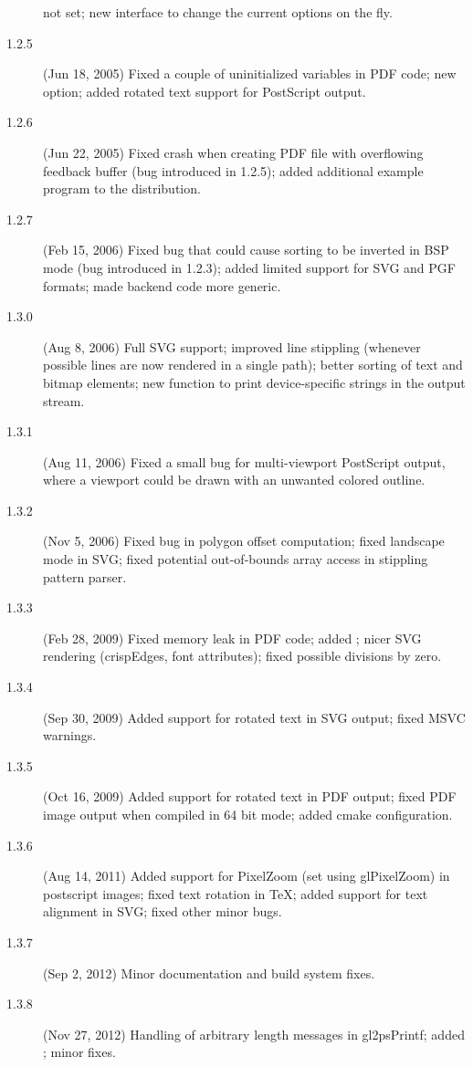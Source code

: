 \begin{description}
  not set; new  interface to change the current
  options on the fly.
\item[1.2.5] (Jun 18, 2005) Fixed a couple of uninitialized variables in
  PDF code; new  option; added rotated
  text support for PostScript output.
\item[1.2.6] (Jun 22, 2005) Fixed crash when creating PDF file with
  overflowing feedback buffer (bug introduced in 1.2.5); added
  additional example program  to the
  distribution.
\item[1.2.7] (Feb 15, 2006) Fixed bug that could cause sorting to be
  inverted in BSP mode (bug introduced in 1.2.3); added limited
  support for SVG and PGF formats; made backend code more generic.
\item[1.3.0] (Aug 8, 2006) Full SVG support; improved line stippling
  (whenever possible lines are now rendered in a single path); better
  sorting of text and bitmap elements; new function 
  to print device-specific strings in the output stream.
\item[1.3.1] (Aug 11, 2006) Fixed a small bug for multi-viewport
  PostScript output, where a viewport could be drawn with an unwanted
  colored outline.
\item[1.3.2] (Nov 5, 2006) Fixed bug in polygon offset computation;
  fixed landscape mode in SVG; fixed potential out-of-bounds array
  access in stippling pattern parser.
\item[1.3.3] (Feb 28, 2009) Fixed memory leak in PDF code; added
  ; nicer SVG rendering (crispEdges, font attributes);
  fixed possible divisions by zero.
\item[1.3.4] (Sep 30, 2009) Added support for rotated text in SVG output;
  fixed MSVC warnings.
\item[1.3.5] (Oct 16, 2009) Added support for rotated text in PDF output;
  fixed PDF image output when compiled in 64 bit mode; added cmake
  configuration.
\item[1.3.6] (Aug 14, 2011) Added support for PixelZoom (set using
  glPixelZoom) in postscript images; fixed text rotation in TeX; added
  support for text alignment in SVG; fixed other minor bugs.
\item[1.3.7] (Sep 2, 2012) Minor documentation and build system fixes.
\item[1.3.8] (Nov 27, 2012) Handling of arbitrary length messages in
  gl2psPrintf; added ; minor fixes.
\end{description}




